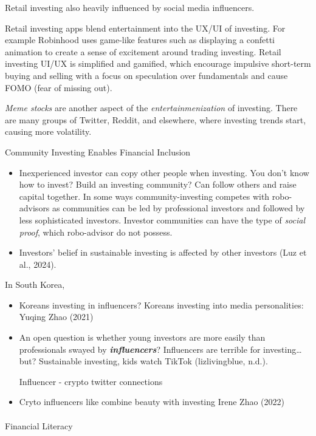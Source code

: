 \documentclass[
  letterpaper,
  DIV=11,
  numbers=noendperiod]{scrartcl}
\makeatletter
\let\oldparagraph\paragraph
\renewcommand{\paragraph}{
    \@ifstar
      \xxxParagraphStar
      \xxxParagraphNoStar
  }
\newcommand{\xxxParagraphStar}[1]{\oldparagraph*{#1}\mbox{}}
\newcommand{\xxxParagraphNoStar}[1]{\oldparagraph{#1}\mbox{}}
\providecommand{\tightlist}{%
  \setlength{\itemsep}{0pt}\setlength{\parskip}{0pt}}\usepackage{longtable,booktabs,array}
\makeatother
\begin{document}
Retail investing also heavily influenced by social media influencers.

Retail investing apps blend entertainment into the UX/UI of investing.
For example Robinhood uses game-like features such as displaying a
confetti animation to create a sense of excitement around trading
investing. Retail investing UI/UX is simplified and gamified, which
encourage impulsive short-term buying and selling with a focus on
speculation over fundamentals and cause FOMO (fear of missing out).

\emph{Meme stocks} are another aspect of the \emph{entertainmenization}
of investing. There are many groups of Twitter, Reddit, and elsewhere,
where investing trends start, causing more volatility.

Community Investing Enables Financial Inclusion

\begin{itemize}
\tightlist
\item
  Inexperienced investor can copy other people when investing. You don't
  know how to invest? Build an investing community? Can follow others
  and raise capital together. In some ways community-investing competes
  with robo-advisors as communities can be led by professional investors
  and followed by less sophisticated investors. Investor communities can
  have the type of \emph{social proof}, which robo-advisor do not
  possess.
\item
  Investors' belief in sustainable investing is affected by other
  investors (Luz et al., 2024).
\end{itemize}

In South Korea,

\begin{itemize}
\item
  Koreans investing in influencers? Koreans investing into media
  personalities: Yuqing Zhao (2021)
\item
  An open question is whether young investors are more easily than
  professionals swayed by \textbf{\emph{influencers}}? Influencers are
  terrible for investing\ldots{} but? Sustainable investing, kids watch
  TikTok (lizlivingblue, n.d.).

  Influencer - crypto twitter connections
\item
  Cryto influencers like combine beauty with investing Irene Zhao (2022)
\end{itemize}

\paragraph{Financial Literacy}\label{financial-literacy}
\end{document}
